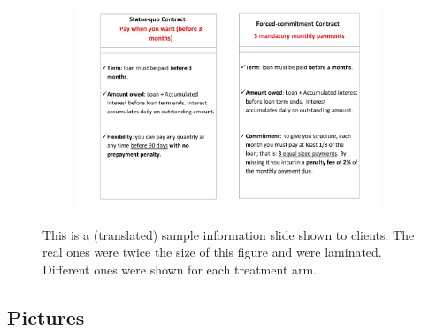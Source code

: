 \begin{figure}[H]
     \caption{Explanatory Material}
    \label{ExplanatoryMaterial}
    \begin{center}
    \begin{subfigure}{\textwidth}
        \centering
        \includegraphics[width=\textwidth]{Figuras/micas.pdf}
    \end{subfigure}
    \end{center}
    \scriptsize
        This is a (translated) sample information slide shown to clients. The real ones were twice the size of this figure and were laminated. Different ones were shown for each treatment arm.
\end{figure}



\cleardoublepage



\subsection{Pictures}

